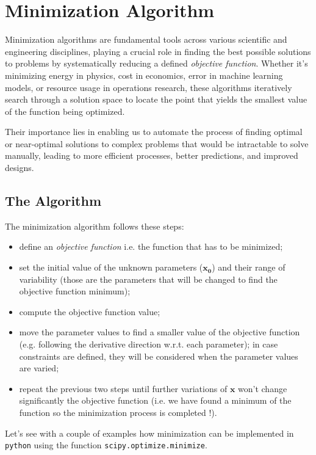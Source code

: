 \section{Minimization  Algorithm}
\label{sec:minimization-algorithm}

Minimization algorithms are fundamental tools across various scientific and engineering disciplines, playing a crucial role in finding the best possible solutions to problems by systematically reducing a defined \emph{objective function}. Whether it's minimizing energy in physics, cost in economics, error in machine learning models, or resource usage in operations research, these algorithms iteratively search through a solution space to locate the point 
that yields the smallest value of the function being optimized. 

Their importance lies in enabling us to automate the process of finding optimal or near-optimal solutions to complex problems that would be intractable to solve manually, leading to more efficient processes, better predictions, and improved designs.

\subsection{The Algorithm}
The minimization algorithm follows these steps:

\begin{itemize}
\tightlist
\item define an \emph{objective function} i.e. the function that has to be minimized;
\item set the initial value of the unknown parameters ($\mathbf{x_0}$) and their range of variability (those are the parameters that will be changed to find  the objective function minimum);
\item compute the objective function value;
\item move the parameter values to find a smaller value of the objective function (e.g. following the derivative direction w.r.t. each parameter); in case constraints are defined, they will be considered when the parameter values are varied;
\item repeat the previous two steps until further variations of $\mathbf{x}$ won't change significantly the objective function (i.e. we have found a minimum of the function so the minimization process is completed !).
\end{itemize}

Let's see with a couple of examples how minimization can be implemented in \texttt{python} using the function \texttt{scipy.optimize.minimize}.

